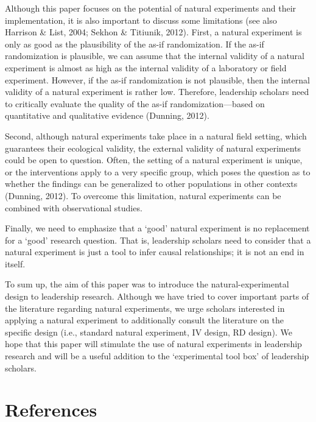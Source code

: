 \documentclass[english]{article}
\begin{document}
Although this paper focuses on the potential of natural experiments and
their implementation, it is also important to discuss some limitations
(see also Harrison \& List, 2004; Sekhon \& Titiunik, 2012). First, a
natural experiment is only as good as the plausibility of the as-if
randomization. If the as-if randomization is plausible, we can assume
that the internal validity of a natural experiment is almost as high as
the internal validity of a laboratory or field experiment. However, if
the as-if randomization is not plausible, then the internal validity of
a natural experiment is rather low. Therefore, leadership scholars need
to critically evaluate the quality of the as-if randomization---based on
quantitative and qualitative evidence (Dunning, 2012).

Second, although natural experiments take place in a natural field
setting, which guarantees their ecological validity, the external
validity of natural experiments could be open to question. Often, the
setting of a natural experiment is unique, or the interventions apply to
a very specific group, which poses the question as to whether the
findings can be generalized to other populations in other contexts
(Dunning, 2012). To overcome this limitation, natural experiments can be
combined with observational studies.

Finally, we need to emphasize that a `good' natural experiment is no
replacement for a `good' research question. That is, leadership scholars
need to consider that a natural experiment is just a tool to infer
causal relationships; it is not an end in itself.

To sum up, the aim of this paper was to introduce the
natural-experimental design to leadership research. Although we have
tried to cover important parts of the literature regarding natural
experiments, we urge scholars interested in applying a natural
experiment to additionally consult the literature on the specific design
(i.e., standard natural experiment, IV design, RD design). We hope that
this paper will stimulate the use of natural experiments in leadership
research and will be a useful addition to the `experimental tool box' of
leadership scholars.


\section*{References}
\end{document}
